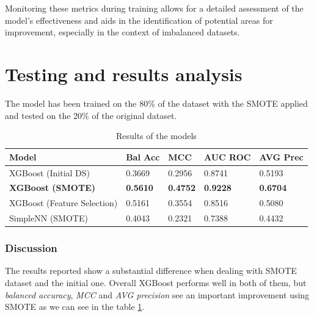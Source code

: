 \documentclass[10pt,twocolumn,letterpaper]{article}
\begin{document}
Monitoring these metrics during training allows for a detailed assessment of the model's effectiveness and aids in the identification of potential areas for improvement, especially in the context of imbalanced datasets.

\section{Testing and results analysis}
The model has been trained on the 80\% of the dataset with the SMOTE applied and tested on the 20\% of the original dataset.
\begin{table}[h!]
    \centering
    \begin{tabular}{|p{1.6cm}|p{1.2cm}|p{1.2cm}|p{1.2cm}|p{1.2cm}|}
    \hline
    \textbf{Model} & \textbf{Bal Acc} & \textbf{MCC} & \textbf{AUC ROC} & \textbf{AVG Prec} \\
    \hline
    XGBoost (Initial DS) & 0.3669 & 0.2956 & 0.8741 & 0.5193 \\
    \hline
    \textbf{XGBoost (SMOTE)} & \textbf{0.5610} & \textbf{0.4752} & \textbf{0.9228} & \textbf{0.6704} \\
    \hline
    XGBoost (Feature Selection) & 0.5161 & 0.3554 & 0.8516 & 0.5080 \\
    \hline
    SimpleNN (SMOTE) & 0.4043 & 0.2321 & 0.7388 & 0.4432 \\ %
    \hline
    \end{tabular}
    \caption{Results of the models}
    \label{tab:results}
\end{table}

\subsubsection{Discussion}
The results reported show a substantial difference when dealing with SMOTE dataset and the initial one. Overall XGBoost 
performs well in both of them, but \textit{balanced accuracy}, \textit{MCC} and \textit{AVG precision} see an important 
improvement using SMOTE as we can see in the table \ref{tab:results}. 
\end{document}
